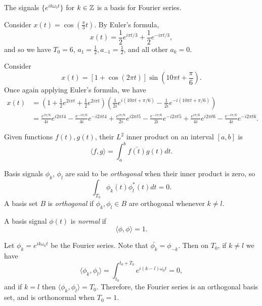 \begin{exmp}
    The signals $\{e^{ik\omega_0t}\}$ for $k \in \mathbb{Z}$ is a basis for Fourier series.
\end{exmp}

\begin{exmp}
    Consider $x(t) = \cos\left(\frac{\pi}{3}t\right)$. By Euler's formula,
    \[x(t) = \frac{1}{2}e^{i\pi t/3} + \frac{1}{2}e^{-i\pi t/3},\]
    and so we have $T_0 = 6$, $a_1 = \frac{1}{2}, a_{-1} = \frac{1}{2}$, and all other $a_k = 0$.
\end{exmp}

\begin{exmp}
    Consider
    \[x(t) = \left[1 + \cos\left(2\pi t\right)\right]\sin\left(10\pi t + \frac{\pi}{6}\right).\]
    Once again applying Euler's formula, we have
    \begin{align*}
        x(t) &= \left(1 + \frac{1}{2}e^{2i\pi t} + \frac{1}{2}e^{2i\pi t}\right)\left(\frac{1}{2i}e^{i(10\pi t + \pi/6)} - \frac{1}{2i}e^{-i(10\pi t + \pi/6)}\right) \\
        &= \frac{e^{i\pi/6}}{4i}e^{i2\pi t4} - \frac{e^{-i\pi/6}}{4i}e^{-i2\pi t4} + \frac{e^{i\pi/6}}{2i}e^{i2\pi t5} - \frac{e^{-i\pi/6}}{2i}e^{-i2\pi t5} + \frac{e^{i\pi/6}}{4i}e^{i2\pi t6} - \frac{e^{-i\pi/6}}{4i}e^{-i2\pi t6}.
    \end{align*}
\end{exmp}

\begin{defn}
    Given functions $f(t), g(t)$, their \emph{$L^2$} inner product on an interval $[a, b]$ is
    \[\langle f, g \rangle = \int_a^b \bar{f(t)}g(t)dt.\]
\end{defn}

\begin{defn}
    Basis signals $\phi_k$, $\phi_l$ are said to be \emph{orthogonal} when their inner product is zero, so
    \[\int_{T_0}\phi_k(t)\phi_l^{*}(t)dt = 0.\]
    A basis set $B$ is \emph{orthogonal} if $\phi_k, \phi_l \in B$ are orthogonal whenever $k \neq l$.
\end{defn}

\begin{defn}
    A basis signal $\phi(t)$ is \emph{normal} if
    \[\langle \phi, \phi \rangle = 1.\]
\end{defn}

\begin{exmp}
    Let $\phi_k = e^{ik\omega_0t}$ be the Fourier series. Note that $\bar{\phi_k} = \phi_{-k}$. Then on $T_0$,
    if $k \neq l$ we have
    \[\langle \phi_k, \phi_l \rangle = \int_{t_0}^{t_0+T_0}e^{i(k-l)\omega_0t} = 0,\]
    and if $k = l$ then $\langle \phi_k, \phi_l \rangle = T_0$. Therefore, the Fourier series is an orthogonal basis set, and is orthonormal when $T_0 = 1$.
\end{exmp}


